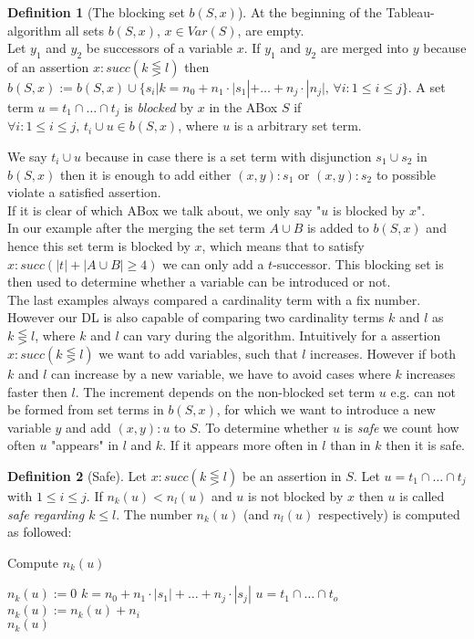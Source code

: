 \documentclass[a4paper,11pt]{scrartcl}
\theoremstyle{break}
\theoremstyle{definition}
\newtheorem{mydef}{Definition}
\begin{document}
\begin{mydef}[The blocking set $b(S,x)$]
At the beginning of the Tableau-algorithm all sets $b(S,x)$, $x\in Var(S)$, are empty.\\
Let $y_1$ and $y_2$ be successors of a variable $x$. If $y_1$ and $y_2$ are merged into $y$ because of an assertion $x:succ(k\lesseqgtr l)$ then $b(S,x):=b(S,x)\cup\{s_i|k=n_0+n_1\cdot|s_1|+\dots+n_j\cdot|n_j|,\,\forall i:1\leq i\leq j\}$. A set term $u=t_1\cap\dots\cap t_j$ is \textit{blocked} by $x$ in the ABox $S$ if $\forall i:1\leq i\leq j,\, t_i\cup u\in b(S,x)$, where $u$ is a arbitrary set term.
\end{mydef}
We say $t_i\cup u$ because in case there is a set term with disjunction $s_1\cup s_2$ in $b(S,x)$ then it is enough to add either $(x,y):s_1$ or $(x,y):s_2$ to possible violate a satisfied assertion.\\
If it is clear of which ABox we talk about, we only say "$u$ is blocked by $x$".\\
In our example after the merging the set term $A\cup B$ is added to $b(S,x)$ and hence this set term is blocked by $x$, which means that to satisfy $x:succ(|t|+|A\cup B|\geq 4)$ we can only add a $t$-successor. This blocking set is then used to determine whether a variable can be introduced or not.\\
The last examples always compared a cardinality term with a fix number. However our DL is also capable of comparing two cardinality terms $k$ and $l$ as $k\lesseqgtr l$, where $k$ and $l$ can vary during the algorithm. Intuitively for a assertion $x:succ(k\lesseqgtr l)$ we want to add variables, such that $l$ increases. However if both $k$ and $l$ can increase by a new variable, we have to avoid cases where $k$ increases faster then $l$. The increment depends on the non-blocked set term $u$ e.g. can not be formed from set terms in $b(S,x)$, for which we want to introduce a new variable $y$ and add $(x,y):u$ to $S$. To determine whether $u$ is \textit{safe} we count how often $u$ "appears" in $l$ and $k$. If it appears more often in $l$ than in $k$ then it is safe.
\begin{mydef}[Safe]
Let $x:succ(k\lesseqgtr l)$ be an assertion in $S$. Let $u=t_1\cap\dots \cap t_j$ with $1\leq i\leq j$. If $n_k(u)<n_l(u)$ and $u$ is not blocked by $x$ then $u$ is called \textit{safe regarding $k\leq l$}. The number $n_k(u)$ (and $n_l(u)$ respectively) is computed as followed:
\begin{algorithm}[H] \caption{Compute $n_k(u)$}
\begin{algorithmic}[l]
\State $n_k(u):=0$
\State $k=n_0+n_1\cdot|s_1|+\dots+n_j\cdot|s_j|$
\State $u=t_1\cap \dots \cap t_o$
\State $n_k(u):=n_k(u)+n_i$
\EndIf
\EndFor\\
\Return $n_k(u)$
\end{algorithmic}
\end{algorithm}
\end{mydef}
\end{document}
